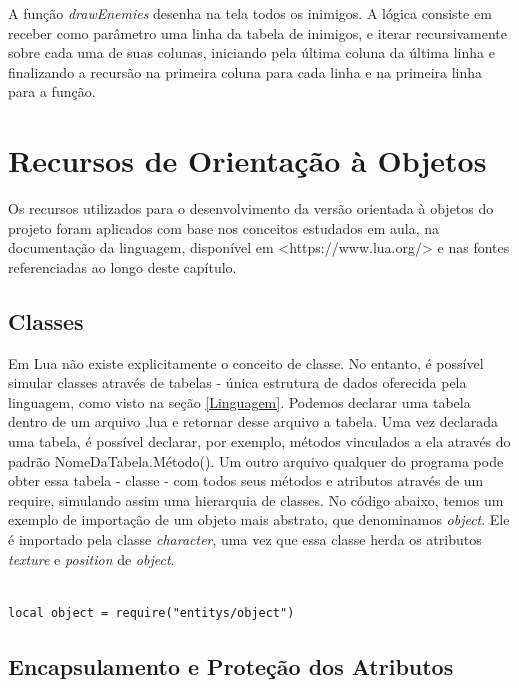 \documentclass[rel_mlp]{iiufrgs}
\begin{document}
A função \textit{drawEnemies} desenha na tela todos os inimigos. A lógica consiste em receber como parâmetro uma linha da tabela de inimigos, e iterar recursivamente sobre cada uma de suas colunas, iniciando pela última coluna da última linha e finalizando a recursão na primeira coluna para cada linha e na primeira linha para a função.


\chapter{Recursos de Orientação à Objetos}

Os recursos utilizados para o desenvolvimento da versão orientada à objetos do projeto foram aplicados com base nos conceitos estudados em aula, na documentação da linguagem, disponível em <https://www.lua.org/> e nas fontes referenciadas ao longo deste capítulo.

\section{Classes} \label{Classes}
	
Em Lua não existe explicitamente o conceito de classe. No entanto, é possível simular classes através de tabelas - única estrutura de dados oferecida pela linguagem, como visto na seção \ref{Linguagem}. Podemos declarar uma tabela dentro de um arquivo .lua e retornar desse arquivo a tabela. Uma vez declarada uma tabela, é possível declarar, por exemplo, métodos vinculados a ela através do padrão NomeDaTabela.Método(). Um outro arquivo qualquer do programa pode obter essa tabela - classe - com todos seus métodos e atributos através de um require, simulando assim uma hierarquia de classes. No código abaixo, temos um exemplo de importação de um objeto mais abstrato, que denominamos \textit{object}. Ele é importado pela classe \textit{character}, uma vez que essa classe herda os atributos \textit{texture} e \textit{position} de \textit{object}.

\begin{lstlisting}

local object = require("entitys/object")

\end{lstlisting}


\section{Encapsulamento e Proteção dos Atributos}
\end{document}
